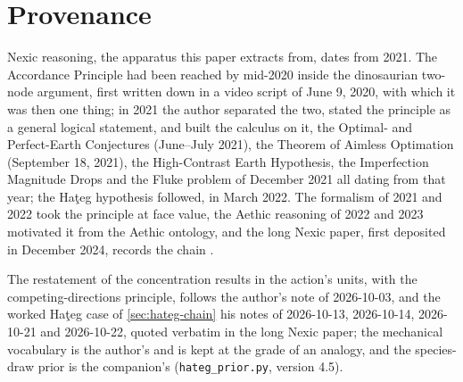 \documentclass[11pt]{article}
\theoremstyle{definition}
\begin{document}
\section*{Provenance}

\noindent Nexic reasoning, the apparatus this paper extracts from, dates from 2021. The Accordance Principle had been reached by mid-2020 inside the dinosaurian two-node argument, first written down in a video script of June 9, 2020, with which it was then one thing; in 2021 the author separated the two, stated the principle as a general logical statement, and built the calculus on it, the Optimal- and Perfect-Earth Conjectures (June--July 2021), the Theorem of Aimless Optimation (September 18, 2021), the High-Contrast Earth Hypothesis, the Imperfection Magnitude Drops and the Fluke problem of December 2021 all dating from that year; the Ha\c{t}eg hypothesis followed, in March 2022. The formalism of 2021 and 2022 took the principle at face value, the Aethic reasoning of 2022 and 2023 motivated it from the Aethic ontology, and the long Nexic paper, first deposited in December 2024, records the chain \cite{Nexus}.

\noindent The restatement of the concentration results in the action's units, with the competing-directions principle, follows the author's note of 2026-10-03, and the worked Ha\c{t}eg case of \autoref{sec:hateg-chain} his notes of 2026-10-13, 2026-10-14, 2026-10-21 and 2026-10-22, quoted verbatim in the long Nexic paper; the mechanical vocabulary is the author's and is kept at the grade of an analogy, and the species-draw prior is the companion's (\texttt{hateg\_prior.py}, version 4.5).

\printbibliography
\end{document}
